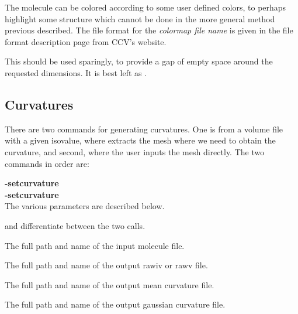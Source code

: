 The molecule can be colored according to
some user defined colors, to perhaps highlight some structure which
cannot be done in the more general method previous described. The
file format for the \emph{colormap file name} is given in the file
format description page from CCV's website.

 This should be used sparingly, to provide a gap of empty
space around the requested dimensions. It is best left as .

\subsection{Curvatures}

There are two commands for generating curvatures. One is from a
volume file with a given isovalue, where \TexMol extracts the mesh
where we need to obtain the curvature, and second, where the user
inputs the mesh directly. The two commands in order are:

\TexMol \textbf{-setcurvature}      
    
\\

\TexMol \textbf{-setcurvature}      
   
\\

The various parameters are described below.

 and  differentiate between the two calls.

 The full path and name of the input molecule
file.

 The full path and name of the output
rawiv or rawv file.

 The full path and name of
the output mean curvature file.

 The full path and name of
the output gaussian curvature file.

